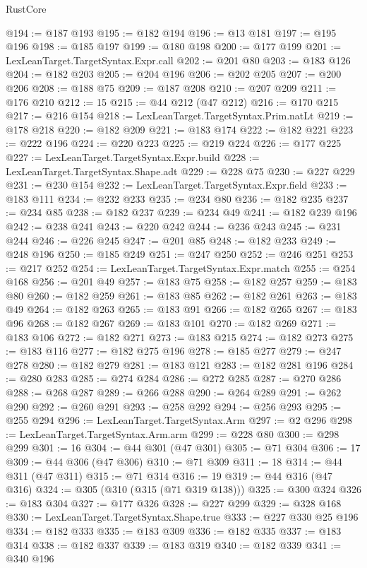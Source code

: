 \begin{lexlean}{RustCore}
\begin{coremodule}
@194 := @187 @193
@195 := @182 @194
@196 := @13 @181
@197 := @195 @196
@198 := @185 @197
@199 := @180 @198
@200 := @177 @199
@201 := LexLeanTarget.TargetSyntax.Expr.call
@202 := @201 @80
@203 := @183 @126
@204 := @182 @203
@205 := @204 @196
@206 := @202 @205
@207 := @200 @206
@208 := @188 @75
@209 := @187 @208
@210 := @207 @209
@211 := @176 @210
@212 := 15
@215 := @44 @212 (@47 @212)
@216 := @170 @215
@217 := @216 @154
@218 := LexLeanTarget.TargetSyntax.Prim.natLt
@219 := @178 @218
@220 := @182 @209
@221 := @183 @174
@222 := @182 @221
@223 := @222 @196
@224 := @220 @223
@225 := @219 @224
@226 := @177 @225
@227 := LexLeanTarget.TargetSyntax.Expr.build
@228 := LexLeanTarget.TargetSyntax.Shape.adt
@229 := @228 @75
@230 := @227 @229
@231 := @230 @154
@232 := LexLeanTarget.TargetSyntax.Expr.field
@233 := @183 @111
@234 := @232 @233
@235 := @234 @80
@236 := @182 @235
@237 := @234 @85
@238 := @182 @237
@239 := @234 @49
@241 := @182 @239 @196
@242 := @238 @241
@243 := @220 @242
@244 := @236 @243
@245 := @231 @244
@246 := @226 @245
@247 := @201 @85
@248 := @182 @233
@249 := @248 @196
@250 := @185 @249
@251 := @247 @250
@252 := @246 @251
@253 := @217 @252
@254 := LexLeanTarget.TargetSyntax.Expr.match
@255 := @254 @168
@256 := @201 @49
@257 := @183 @75
@258 := @182 @257
@259 := @183 @80
@260 := @182 @259
@261 := @183 @85
@262 := @182 @261
@263 := @183 @49
@264 := @182 @263
@265 := @183 @91
@266 := @182 @265
@267 := @183 @96
@268 := @182 @267
@269 := @183 @101
@270 := @182 @269
@271 := @183 @106
@272 := @182 @271
@273 := @183 @215
@274 := @182 @273
@275 := @183 @116
@277 := @182 @275 @196
@278 := @185 @277
@279 := @247 @278
@280 := @182 @279
@281 := @183 @121
@283 := @182 @281 @196
@284 := @280 @283
@285 := @274 @284
@286 := @272 @285
@287 := @270 @286
@288 := @268 @287
@289 := @266 @288
@290 := @264 @289
@291 := @262 @290
@292 := @260 @291
@293 := @258 @292
@294 := @256 @293
@295 := @255 @294
@296 := LexLeanTarget.TargetSyntax.Arm
@297 := @2 @296
@298 := LexLeanTarget.TargetSyntax.Arm.arm
@299 := @228 @80
@300 := @298 @299
@301 := 16
@304 := @44 @301 (@47 @301)
@305 := @71 @304
@306 := 17
@309 := @44 @306 (@47 @306)
@310 := @71 @309
@311 := 18
@314 := @44 @311 (@47 @311)
@315 := @71 @314
@316 := 19
@319 := @44 @316 (@47 @316)
@324 := @305 (@310 (@315 (@71 @319 @138)))
@325 := @300 @324
@326 := @183 @304
@327 := @177 @326
@328 := @227 @299
@329 := @328 @168
@330 := LexLeanTarget.TargetSyntax.Shape.true
@333 := @227 @330 @25 @196
@334 := @182 @333
@335 := @183 @309
@336 := @182 @335
@337 := @183 @314
@338 := @182 @337
@339 := @183 @319
@340 := @182 @339
@341 := @340 @196

\end{coremodule}
\end{lexlean}
